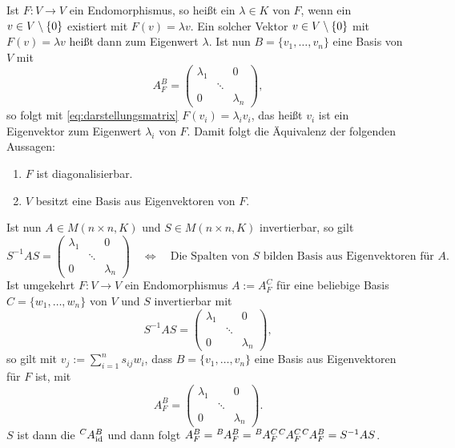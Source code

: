 Ist $F \colon V \rightarrow V$ ein Endomorphismus, so heißt ein $\lambda \in K$  von $F$, wenn ein $v \in V \setminus \{0\}$ existiert mit $F(v) = \lambda v$.
Ein solcher Vektor $v \in V\setminus \{0\}$ mit $F(v) = \lambda v$ heißt dann  zum Eigenwert $\lambda$.
Ist nun $B = \{v_1,\dots,v_n\}$ eine Basis von $V$ mit
\[
	A_F^B =\begin{pmatrix}
	\lambda_1 &  & 0 \\ 
	& \ddots &  \\ 
	0 &  & \lambda_n
	\end{pmatrix},
\]
so folgt mit \eqref{eq:darstellungsmatrix} $F(v_i) = \lambda_i v_i$, das heißt $v_i$ ist ein Eigenvektor zum Eigenwert $\lambda_i$ von $F$.
Damit folgt die Äquivalenz der folgenden Aussagen:
\begin{enumerate}[(1)]
	\item $F$ ist diagonalisierbar.
	\item $V$ besitzt eine Basis aus Eigenvektoren von $F$.
\end{enumerate}
Ist nun $A \in M(n\times n,K)$ und $S \in M(n \times n,K)$ invertierbar, so gilt
\[
	S^{-1}AS = \begin{pmatrix}
	\lambda_1 &  & 0 \\ 
	& \ddots &  \\ 
	0 &  & \lambda_n
	\end{pmatrix} \quad \Leftrightarrow \quad \text{Die Spalten von } S \text{ bilden Basis aus Eigenvektoren für } A.
\]
Ist umgekehrt $F \colon V \rightarrow V$ ein Endomorphismus $A := A_F^C$ für eine beliebige Basis $C = \{w_1,\dots,w_n\}$ von $V$ und $S$ invertierbar mit
\[
	S^{-1}AS = \begin{pmatrix}
	\lambda_1 &  & 0 \\ 
	& \ddots &  \\ 
	0 &  & \lambda_n
	\end{pmatrix},
\]
so gilt mit $v_j := \sum_{i=1}^{n} s_{ij}w_i$, dass $B=\{v_1,\dots,v_n\}$ eine Basis aus Eigenvektoren für $F$ ist, mit
\[
	A_F^B = \begin{pmatrix}
	\lambda_1 &  & 0 \\ 
	& \ddots &  \\ 
	0 &  & \lambda_n
	\end{pmatrix}.
\]
$S$ ist dann die  $\mat{A}{C}{B}{\id}$ und dann folgt $A_F^B = \mat{A}{B}{B}{F} = \mat{A}{B}{C}{F} \mat{A}{C}{C}{F} \mat{A}{C}{B}{F} = S^{-1}AS$.

